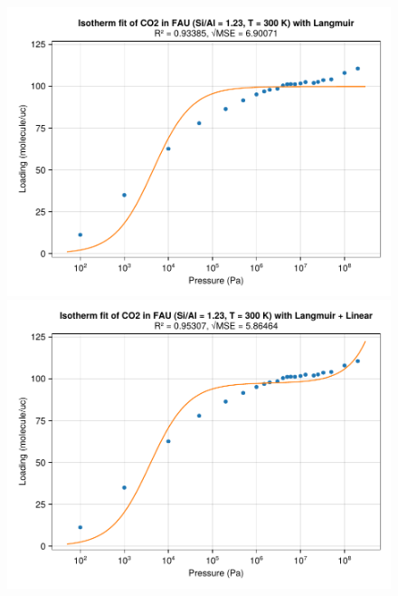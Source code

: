 \documentclass[main.tex]{subfiles}
\begin{document}
\begin{figure}
	\begin{minipage}{0.49\columnwidth}
		\includegraphics[width=\columnwidth]{figures/isotherms/Langmuir.pdf}
	\end{minipage}\hfill%
	\begin{minipage}{0.49\columnwidth}
		\includegraphics[width=\columnwidth]{figures/isotherms/Langmuir + Linear.pdf}
	\end{minipage}
	

\end{figure}
\end{document}
